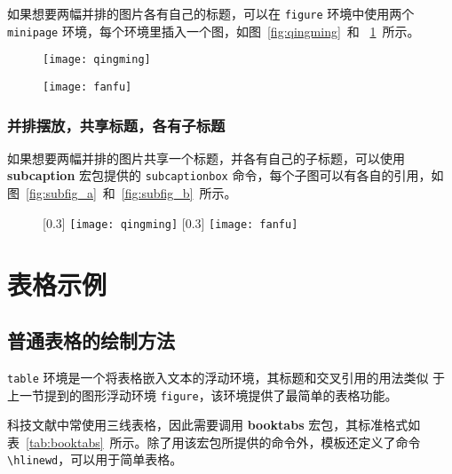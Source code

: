 如果想要两幅并排的图片各有自己的标题，可以在 \texttt{figure} 环境中使用两个
 \texttt{minipage} 环境，每个环境里插入一个图，如图~\ref{fig:qingming}~和
~\ref{fig:fanfu}~所示。

\begin{figure}[htbp]
\centering
\begin{minipage}[t]{0.3\textwidth}
    \centering
    \texttt{[image: qingming]}
    \label{fig:qingming}
\end{minipage}
\hspace{36pt}
\begin{minipage}[t]{0.3\textwidth}
    \centering
    \texttt{[image: fanfu]}
    \label{fig:fanfu}
\end{minipage}
\end{figure}

\subsubsection*{并排摆放，共享标题，各有子标题}

如果想要两幅并排的图片共享一个标题，并各有自己的子标题，可以使用 \textbf{subcaption} 宏包提供的 \texttt{subcaptionbox} 命令，每个子图可以有各自的引用，如图~\ref{fig:subfig_a}~和~\ref{fig:subfig_b}~所示。

\begin{figure}[htbp]
\centering
{}[0.3\textwidth]{
    \texttt{[image: qingming]}
}
\hspace{36pt}
[0.3\textwidth]{
    \texttt{[image: fanfu]}
}
\end{figure}

\section{表格示例}
\label{sec:table}

\subsection{普通表格的绘制方法}

\texttt{table} 环境是一个将表格嵌入文本的浮动环境，其标题和交叉引用的用法类似
于上一节提到的图形浮动环境 \texttt{figure}，该环境提供了最简单的表格功能。

科技文献中常使用三线表格，因此需要调用 \textbf{booktabs} 宏包，其标准格式如表~\ref{tab:booktabs}~所示。除了用该宏包所提供的命令外，模板还定义了命令 \verb|\hlinewd|，可以用于简单表格。

